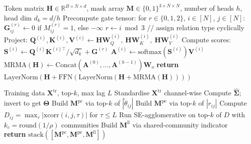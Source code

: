 \begin{algorithm}[t]
\caption{MRMA forward pass for one encoder layer}
\label{alg:mrma}
\begin{algorithmic}[1]
\REQUIRE Token matrix $\mathbf{H}\in\mathbb{R}^{B\times N\times d}$,
         mask array $\mathbf{M}\in\{0,1\}^{3\times N\times N}$,
         number of heads $h$, head dim $d_k=d/h$
\STATE Precompute gate tensor: for $r\in\{0,1,2\}$, $i\in[N]$, $j\in[N]$:
       $\mathbf{G}^{(r)}_{ij} \leftarrow 0$ if $M^{(r)}_{ij}=1$, else $-\infty$
  \STATE $r \leftarrow i \bmod 3$ \hfill // assign relation type cyclically
  \STATE Project: $\mathbf{Q}^{(i)}, \mathbf{K}^{(i)}, \mathbf{V}^{(i)} \leftarrow
         \mathbf{H}\mathbf{W}_Q^{(i)},\ \mathbf{H}\mathbf{W}_K^{(i)},\ \mathbf{H}\mathbf{W}_V^{(i)}$
  \STATE Compute scores: $\mathbf{S}^{(i)} \leftarrow
         \mathbf{Q}^{(i)}\mathbf{K}^{(i)\top} / \sqrt{d_k} + \mathbf{G}^{(r)}$
  \STATE $\mathbf{A}^{(i)} \leftarrow \mathrm{softmax}(\mathbf{S}^{(i)})\mathbf{V}^{(i)}$
\ENDFOR
\STATE $\mathrm{MRMA}(\mathbf{H}) \leftarrow
       \mathrm{Concat}(\mathbf{A}^{(0)},\ldots,\mathbf{A}^{(h-1)})\mathbf{W}_o$
\STATE \textbf{return} $\mathrm{LayerNorm}(\mathbf{H} + \mathrm{FFN}(\mathrm{LayerNorm}(\mathbf{H} + \mathrm{MRMA}(\mathbf{H}))))$
\end{algorithmic}
\end{algorithm}

\begin{algorithm}[t]
\caption{MultiRel graph precomputation}
\label{alg:precompute}
\begin{algorithmic}[1]
\REQUIRE Training data $\mathbf{X}^{\text{tr}}$, top-$k$, max lag $L$
\STATE Standardise $\mathbf{X}^{\text{tr}}$ channel-wise
\STATE Compute $\hat{\boldsymbol{\Sigma}}$; invert to get $\boldsymbol{\Theta}$
\STATE Build $\mathbf{M}^{\text{pc}}$ via top-$k$ of $|\tilde{\theta}_{ij}|$
\STATE Build $\mathbf{M}^{\text{pe}}$ via top-$k$ of $|r_{ij}|$
\STATE Compute $D_{ij}=\max_\tau|\text{xcorr}(i,j,\tau)|$ for $\tau\le L$
\STATE Run SE-agglomerative on top-$k$ of $D$ with $k_c{=}\mathrm{round}(1/\rho)$ communities
\STATE Build $\mathbf{M}^{\text{ll}}$ via shared-community indicator
\STATE \textbf{return} $\mathrm{stack}([\mathbf{M}^{\text{pc}},\mathbf{M}^{\text{pe}},\mathbf{M}^{\text{ll}}])$
\end{algorithmic}
\end{algorithm}
